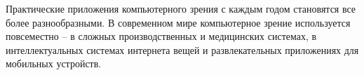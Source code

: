 




Практические приложения компьютерного зрения с каждым годом становятся все более разнообразными. В современном мире компьютерное зрение используется повсеместно -- в сложных производственных и медицинских системах, в интеллектуальных системах интернета вещей и развлекательных приложениях для мобильных устройств.

